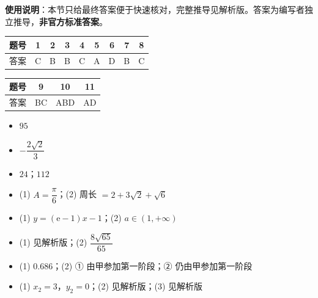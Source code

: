 
\begin{gknotice}
\textbf{使用说明}：本节只给最终答案便于快速核对，完整推导见解析版。答案为编写者独立推导，\textbf{非官方标准答案}。
\end{gknotice}

\begin{center}\begin{tabular}{ccccccccc}
\toprule
题号 & 1 & 2 & 3 & 4 & 5 & 6 & 7 & 8 \\
\midrule
答案 & C & B & B & C & A & D & B & C \\
\bottomrule
\end{tabular}\end{center}

\begin{center}\begin{tabular}{cccc}
\toprule
题号 & 9 & 10 & 11 \\
\midrule
答案 & BC & ABD & AD \\
\bottomrule
\end{tabular}\end{center}

\begin{itemize}[leftmargin=2.6em]
  \item[\textbf{12.}] $95$
  \item[\textbf{13.}] $-\dfrac{2\sqrt2}3$
  \item[\textbf{14.}] $24$；$112$
\end{itemize}

\begin{itemize}[leftmargin=2.6em]
  \item[\textbf{15.}] (1) $A=\dfrac\pi6$；(2) 周长 $=2+3\sqrt2+\sqrt6$
  \item[\textbf{16.}] (1) $y=(\mathrm e-1)x-1$；(2) $a\in(1,+\infty)$
  \item[\textbf{17.}] (1) 见解析版；(2) $\dfrac{8\sqrt{65}}{65}$
  \item[\textbf{18.}] (1) $0.686$；(2) ① 由甲参加第一阶段；② 仍由甲参加第一阶段
  \item[\textbf{19.}] (1) $x_2=3$，$y_2=0$；(2) 见解析版；(3) 见解析版
\end{itemize}
